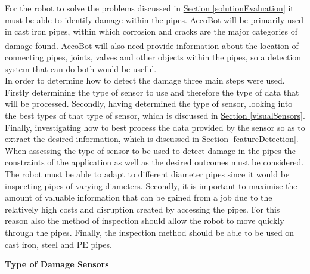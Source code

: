 \documentclass[11pt]{article}		%
\newcommand{\supercite}[1]{\textsuperscript{\cite{#1}}}		%
\newcommand{\sectref}[1]{\hyperref[#1]{Section \ref*{#1}}}     %
\begin{document}
	        For the robot to solve the problems discussed in \sectref{solutionEvaluation} it must be able to identify damage within the pipes.
	        AccoBot will be primarily used in cast iron pipes, within which corrosion and cracks are the major categories of damage found\supercite{Failure_pipes}\supercite{Failure_pipes2}.
	        AccoBot will also need provide information about the location of connecting pipes, joints, valves and other objects within the pipes, so a detection system that can do both would be useful.
	        \\
            \hspace*{2ex}In order to determine how to detect the damage three main steps were used. 
	        Firstly determining the type of sensor to use and therefore the type of data that will be processed. 
	        Secondly, having determined the type of sensor, looking into the best types of that type of sensor, which is discussed in \sectref{visualSensors}.
	        Finally, investigating how to best process the data provided by the sensor so as to extract the desired information, which is discussed in \sectref{featureDetection}.
	       \\\hspace*{2ex}
	        When assessing the type of sensor to be used to detect damage in the pipes the constraints of the application as well as the desired outcomes must be considered.
            The robot must be able to adapt to different diameter pipes since it would be inspecting pipes of varying diameters.
	        Secondly, it is important to maximise the amount of valuable information that can be gained from a job due to the relatively high costs and disruption created by accessing the pipes.
	        For this reason also the method of inspection should allow the robot to move quickly through the pipes. 
	        Finally, the inspection method should be able to be used on cast iron, steel and PE pipes. 
	
	   \textbf{Type of Damage Sensors}\label{damagesensors}
	        
\end{document}
